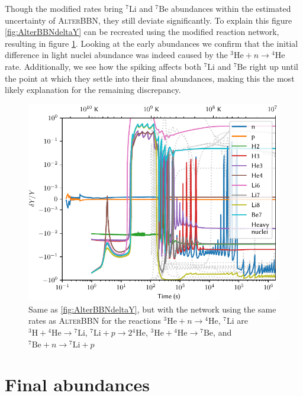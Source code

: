 Though the modified rates bring ${}^7\text{Li}$ and ${}^7\text{Be}$ abundances within the estimated uncertainty of \textsc{AlterBBN}, they still deviate significantly. To explain this figure \ref{fig:AlterBBNdeltaY} can be recreated using the modified reaction network, resulting in figure \ref{fig:AlterratesBBNdeltaY}. Looking at the early abundances we confirm that the initial difference in light nuclei abundance was indeed caused by the ${}^3\text{He}+n\rightarrow {}^4\text{He}$ rate. Additionally, we see how the spiking affects both ${}^7\text{Li}$ and ${}^7\text{Be}$ right up until the point at which they settle into their final abundances, making this the most likely explanation for the remaining discrepancy.

\begin{figure}[ht]
    \includegraphics[width=5.1in]{figures/AlterratesBBNdeltaY.pdf}
    \caption{Same as \cref{fig:AlterBBNdeltaY}, but with the network using the same rates as \textsc{AlterBBN} for the reactions ${}^3\text{He}+n\rightarrow {}^4\text{He}$, ${}^7\text{Li}$ are ${}^3\text{H}+{}^4\text{He}\rightarrow {}^7\text{Li}$, ${}^7\text{Li} + p\rightarrow 2{}^4\text{He}$, ${}^3\text{He}+{}^4\text{He}\rightarrow {}^7\text{Be}$, and ${}^7\text{Be} + n\rightarrow {}^7\text{Li} + p$}
    \label{fig:AlterratesBBNdeltaY}
\end{figure}



\section{Final abundances}

